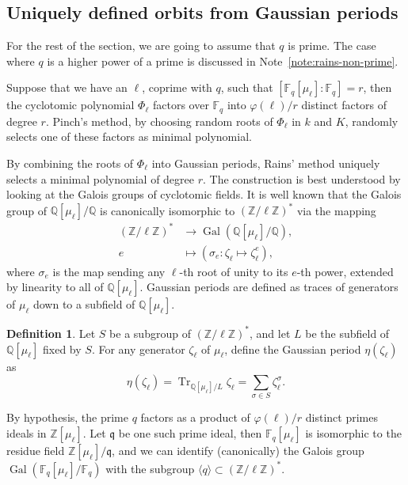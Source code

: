 \documentclass[12pt]{article}
\theoremstyle{plain}
\theoremstyle{definition}
\newtheorem{definition}[theorem]{Definition}
\DeclareMathOperator{\trace}{Tr} %
\DeclareMathOperator{\gal}{Gal} %
\def\Q{\ensuremath{\mathbb{Q}}}
\def\Z{\ensuremath{\mathbb{Z}}}
\def\F{\ensuremath{\mathbb{F}}}
\def\euler{\ensuremath{\varphi}}
\begin{document}
\subsection{Uniquely defined orbits from Gaussian periods}

For the rest of the section, we are going to assume that $q$ is
prime. The case where $q$ is a higher power of a prime is discussed in
Note~\ref{note:rains-non-prime}.

Suppose that we have an $\ell$, coprime with $q$, such that
$[\F_q[\mu_\ell]:\F_q]=r$, then the cyclotomic polynomial $\Phi_\ell$
factors over $\F_q$ into $\euler(\ell)/r$ distinct factors of degree
$r$. Pinch's method, by choosing random roots of $\Phi_\ell$ in $k$
and $K$, randomly selects one of these factors as minimal polynomial.

By combining the roots of $\Phi_\ell$ into Gaussian periods, Rains'
method uniquely selects a minimal polynomial of degree $r$. The
construction is best understood by looking at the Galois groups of
cyclotomic fields. It is well known that the Galois group of
$\Q[\mu_\ell]/\Q$ is canonically isomorphic to $(\Z/\ell\Z)^\ast$ via
the mapping
\begin{equation*}
  \begin{aligned}
    (\Z/\ell\Z)^\ast &\to \gal(\Q[\mu_\ell]/\Q),\\
    e &\mapsto (\sigma_e : \zeta_\ell\mapsto\zeta_\ell^e),
  \end{aligned}
\end{equation*}
where $\sigma_e$ is the map sending any $\ell$-th root of unity to its
$e$-th power, extended by linearity to all of $\Q[\mu_\ell]$. Gaussian
periods are defined as traces of generators of $\mu_\ell$ down to a
subfield of $\Q[\mu_\ell]$.

\begin{definition}
  Let $S$ be a subgroup of $(\Z/\ell\Z)^\ast$, and let $L$ be the
  subfield of $\Q[\mu_\ell]$ fixed by $S$. For any generator
  $\zeta_\ell$ of $\mu_\ell$, define the Gaussian period
  $\eta(\zeta_\ell)$ as
  \begin{equation}
    \eta(\zeta_\ell) = \trace_{\Q[\mu_\ell]/L} \zeta_\ell = \sum_{\sigma\in S}{\zeta_\ell^{\sigma}}.
  \end{equation}
\end{definition}

By hypothesis, the prime $q$ factors as a product of $\euler(\ell)/r$
distinct primes ideals in $\Z[\mu_\ell]$. Let $\mathfrak{q}$ be one
such prime ideal, then $\F_q[\mu_\ell]$ is isomorphic to the residue
field $\Z[\mu_\ell]/\mathfrak{q}$, and we can identify (canonically)
the Galois group $\gal(\F_q[\mu_\ell]/\F_q)$ with the subgroup
$\langle q\rangle\subset(\Z/\ell\Z)^\ast$.
\end{document}
